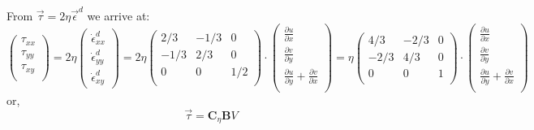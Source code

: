 From $\vec{\tau} = 2\eta \vec{\epsilon}^d$ we arrive at:
\[
\left(
\begin{array}{c}
\tau_{xx}\\
\tau_{yy}\\
\tau_{xy}\\
\end{array}
\right)
=
2\eta
\left(
\begin{array}{c}
\dot{\epsilon}_{xx}^d \\
\dot{\epsilon}_{yy}^d \\
\dot{\epsilon}_{xy}^d 
\end{array}
\right)
=2 \eta
\left(
\begin{array}{ccc}
2/3 & -1/3& 0 \\
-1/3 & 2/3 & 0 \\
0 & 0 & 1/2 \\
\end{array}
\right)
\cdot 
\left(
\begin{array}{c}
\frac{\partial u}{\partial x} \\ 
\frac{\partial v}{\partial y} \\ 
\frac{\partial u}{\partial y}\! +\! \frac{\partial v}{\partial x} \\
\end{array}
\right)
=
\eta
\left(
\begin{array}{ccc}
4/3 & -2/3& 0 \\
-2/3 & 4/3 & 0 \\
0 & 0 & 1 \\
\end{array}
\right)
\cdot 
\left(
\begin{array}{c}
\frac{\partial u}{\partial x} \\ 
\frac{\partial v}{\partial y} \\ 
\frac{\partial u}{\partial y}\! +\! \frac{\partial v}{\partial x} \\
\end{array}
\right)
\]
or, 
\[
\vec{\tau} = {\bm C}_\eta {\bm B} V
\]







